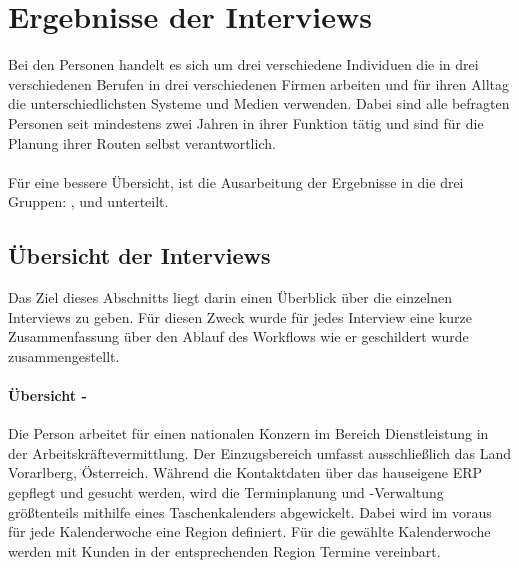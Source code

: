 \documentclass[Bachelorarbeit.tex]{subfiles}
\begin{document}
\section{Ergebnisse der Interviews}
Bei den Personen handelt es sich um drei verschiedene Individuen die in drei verschiedenen Berufen in drei verschiedenen Firmen arbeiten und für ihren Alltag die unterschiedlichsten Systeme und Medien verwenden. 
Dabei sind alle befragten Personen seit mindestens zwei Jahren in ihrer Funktion tätig und sind für die Planung ihrer Routen selbst verantwortlich.
\\
\\
Für eine bessere Übersicht, ist die Ausarbeitung der Ergebnisse in die drei Gruppen:
,  und  unterteilt. 


\subsection{Übersicht der Interviews}
\label{UebersichtDerInterviews}
Das Ziel dieses Abschnitts liegt darin einen Überblick über die einzelnen Interviews zu geben. 
Für diesen Zweck wurde für jedes Interview eine kurze Zusammenfassung über den Ablauf des Workflows wie er geschildert wurde zusammengestellt.

\paragraph*{Übersicht - } 

Die Person arbeitet für einen nationalen Konzern im Bereich Dienstleistung in der Arbeitskräftevermittlung. 
Der Einzugsbereich umfasst ausschließlich das Land Vorarlberg, Österreich.
Während die Kontaktdaten über das hauseigene \ac{ERP} gepflegt und gesucht werden, wird die Terminplanung und -Verwaltung größtenteils mithilfe eines Taschenkalenders abgewickelt.
Dabei wird im voraus für jede Kalenderwoche eine Region definiert. 
Für die gewählte Kalenderwoche werden mit Kunden in der entsprechenden Region Termine vereinbart.\\
\end{document}
